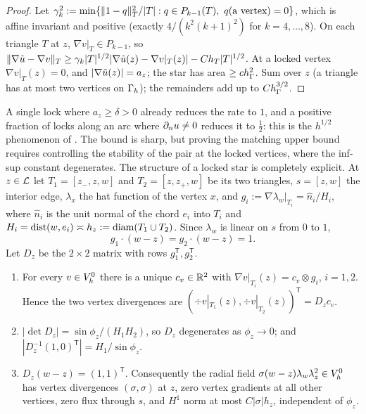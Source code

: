 \begin{proof}
Let $\gamma_k^2:=\min\{\lVert 1-q\rVert^2_T/|T|:q\in P_{k-1}(T),\ q(\text{a vertex})=0\}$, which is affine invariant and positive (exactly $4/(k^2(k+1)^2)$ for $k=4,\dots,8$). On each triangle $T$ at $z$, $\nabla v|_T\in P_{k-1}$, so $\lVert \nabla\tilde u-\nabla v\rVert_T\ge\gamma_k|T|^{1/2}|\nabla\tilde u(z)-\nabla v|_T(z)|-Ch_T|T|^{1/2}$. At a locked vertex $\nabla v|_T(z)=0$, and $|\nabla\tilde u(z)|=a_z$; the star has area $\ge ch_\Gamma^2$. Sum over $z$ (a triangle has at most two vertices on $\Gamma_h$); the remainders add up to $Ch_\Gamma^{3/2}$.
\end{proof}

A single lock where $a_z\ge\delta>0$ already reduces the rate to $1$, and a positive fraction of locks along an arc where $\partial_n u\ne0$ reduces it to $\frac12$: this is the $h^{1/2}$ phenomenon of \cite{ScottPrize,GjerdeScott2024}. The bound is sharp, but proving the matching upper bound requires controlling the stability of the pair at the locked vertices, where the inf-sup constant degenerates. The structure of a locked star is completely explicit. At $z\in\mathcal L$ let $T_1=[z_-,z,w]$ and $T_2=[z,z_+,w]$ be its two triangles, $s=[z,w]$ the interior edge, $\lambda_x$ the hat function of the vertex $x$, and $g_i:=\nabla\lambda_w|_{T_i}=\hat n_i/H_i$, where $\hat n_i$ is the unit normal of the chord $e_i$ into $T_i$ and $H_i=\operatorname{dist}(w,e_i)\asymp h_z:=\operatorname{diam}(T_1\cup T_2)$. Since $\lambda_w$ is linear on $s$ from $0$ to $1$,
\begin{equation}\label{eq:st:gs}
g_1\cdot(w-z)=g_2\cdot(w-z)=1 .
\end{equation}
Let $D_z$ be the $2\times2$ matrix with rows $g_1^{\mathsf T},g_2^{\mathsf T}$.

\begin{lemma}\label{lem:st:K}
\begin{enumerate}[label=(\alph*)]
\item For every $v\in V_h^0$ there is a unique $c_v\in\mathbb R^2$ with $\nabla v|_{T_i}(z)=c_v\otimes g_i$, $i=1,2$. Hence the two vertex divergences are $(\div v|_{T_1}(z),\div v|_{T_2}(z))^{\mathsf T}=D_zc_v$.
\item $|\det D_z|=\sin\phi_z/(H_1H_2)$, so $D_z$ degenerates as $\phi_z\to0$; and $|D_z^{-1}(1,0)^{\mathsf T}|=H_1/\sin\phi_z$.
\item $D_z(w-z)=(1,1)^{\mathsf T}$. Consequently the radial field $\sigma(w-z)\lambda_w\lambda_z^2\in V_h^0$ has vertex divergences $(\sigma,\sigma)$ at $z$, zero vertex gradients at all other vertices, zero flux through $s$, and $H^1$ norm at most $C|\sigma|h_z$, independent of $\phi_z$.
\end{enumerate}
\end{lemma}

